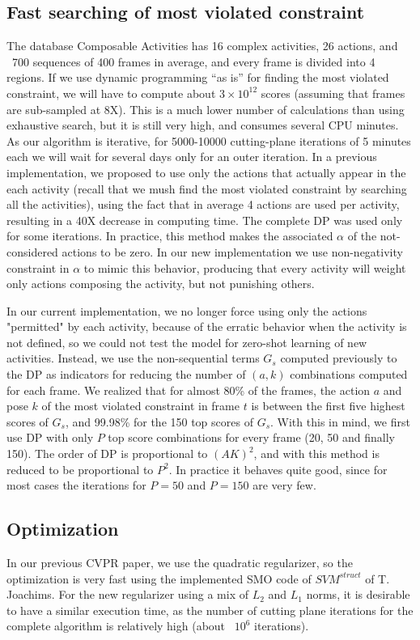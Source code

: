 \documentclass[10pt,letterpaper]{article}
\newcommand{\+}[1]{\ensuremath{{\boldsymbol #1}}}
\begin{document}
\subsection{Fast searching of most violated constraint}
The database Composable Activities has 16 complex activities, 26 actions, and ~700 sequences of 400 frames in average, and every frame is divided into 4 regions. If we use dynamic programming ``as is'' for finding the most violated constraint, we will have to compute about $3\times 10^{12}$ scores (assuming that frames are sub-sampled at 8X). This is a much lower number of calculations than using exhaustive search, but it is still very high, and consumes several CPU minutes. As our algorithm is iterative, for 5000-10000 cutting-plane iterations of 5 minutes each we will wait for several days only for an outer iteration. In a previous implementation, we proposed to use only the actions that actually appear in the each activity (recall that we mush find the most violated constraint by searching all the activities), using the fact that in average 4 actions are used per activity, resulting in a 40X decrease in computing time. The complete DP was used only for some iterations. In practice, this method makes the associated $\alpha$ of the not-considered actions to be zero. In our new implementation we use non-negativity constraint in $\alpha$ to mimic this behavior, producing that every activity will weight only actions composing the activity, but not punishing others.

In our current implementation, we no longer force using only the actions "permitted" by each activity, because of the erratic behavior when the activity is not defined, so we could not test the model for zero-shot learning of new activities. Instead, we use the non-sequential terms $G_s$ computed previously to the DP as indicators for reducing the number of $(a,k)$ combinations computed for each frame. We realized that for almost 80\% of the frames, the action $a$ and pose $k$ of the most violated constraint in frame $t$ is between the first five highest scores of $G_s$, and 99.98\% for the 150 top scores of $G_s$. With this in mind, we first use DP with only $P$ top score combinations for every frame (20, 50 and finally 150). The order of DP is proportional to $(AK)^2$, and with this method is reduced to be proportional to $P^2$. In practice it behaves quite good, since for most cases the iterations for $P=50$ and $P=150$ are very few. 

\subsection{Optimization}
In our previous CVPR paper, we use the quadratic regularizer, so the optimization is very fast using the implemented SMO code of $SVM^{struct}$ of T. Joachims. For the new regularizer using a mix of $L_2$ and $L_1$ norms, it is desirable to have a similar execution time, as the number of cutting plane iterations for the complete algorithm is relatively high (about ~$10^6$ iterations). 
\end{document}

